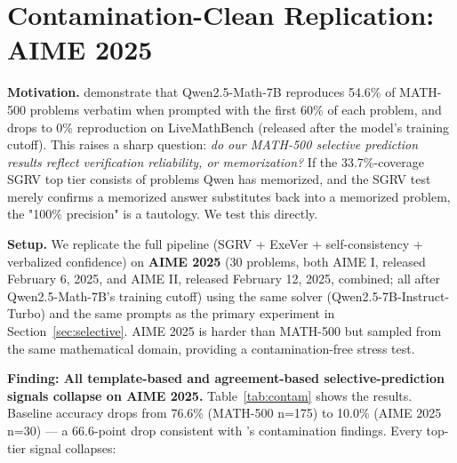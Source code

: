 \documentclass{article}
\begin{document}
\section{Contamination-Clean Replication: AIME 2025}
\label{sec:contam}

\textbf{Motivation.} \citet{wu2025contam} demonstrate that Qwen2.5-Math-7B reproduces 54.6\% of MATH-500 problems verbatim when prompted with the first 60\% of each problem, and drops to 0\% reproduction on LiveMathBench (released after the model's training cutoff). This raises a sharp question: \emph{do our MATH-500 selective prediction results reflect verification reliability, or memorization?} If the 33.7\%-coverage SGRV top tier consists of problems Qwen has memorized, and the SGRV test merely confirms a memorized answer substitutes back into a memorized problem, the "100\% precision" is a tautology. We test this directly.

\textbf{Setup.} We replicate the full pipeline (SGRV + ExeVer + self-consistency + verbalized confidence) on \textbf{AIME 2025} (30 problems, both AIME I, released February 6, 2025, and AIME II, released February 12, 2025, combined; all after Qwen2.5-Math-7B's training cutoff) using the same solver (Qwen2.5-7B-Instruct-Turbo) and the same prompts as the primary experiment in Section~\ref{sec:selective}. AIME 2025 is harder than MATH-500 but sampled from the same mathematical domain, providing a contamination-free stress test.

\textbf{Finding: All template-based and agreement-based selective-prediction signals collapse on AIME 2025.} Table~\ref{tab:contam} shows the results. Baseline accuracy drops from 76.6\% (MATH-500 n=175) to 10.0\% (AIME 2025 n=30) --- a 66.6-point drop consistent with \citet{wu2025contam}'s contamination findings. Every top-tier signal collapses:
\end{document}
